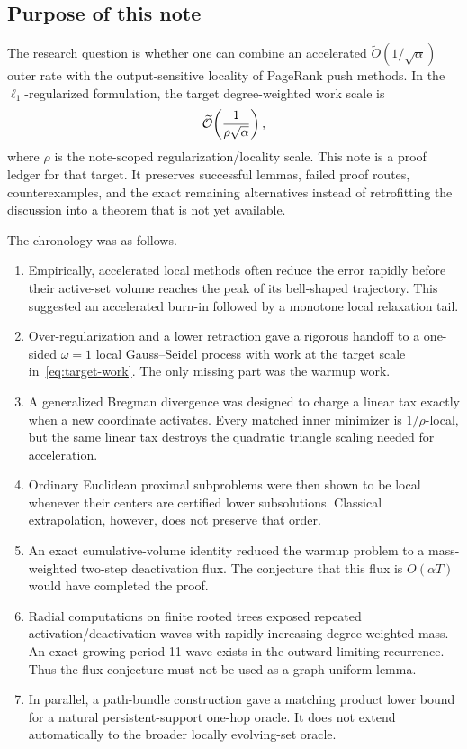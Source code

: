 \subsection{Purpose of this note}

The research question is whether one can combine an accelerated
$\widetilde O(1/\sqrt{\alpha})$ outer rate with the output-sensitive locality
of PageRank push methods.  In the $\ell_1$-regularized formulation, the target
degree-weighted work scale is
\begin{equation}
  \widetilde{\mathcal{O}}\!\left(\frac{1}{\rho\sqrt{\alpha}}\right),
  \label{eq:target-work}
\end{equation}
where $\rho$ is the note-scoped regularization/locality scale.  This note is a
proof ledger for that target.  It preserves successful lemmas, failed proof
routes, counterexamples, and the exact remaining alternatives instead of
retrofitting the discussion into a theorem that is not yet available.

The chronology was as follows.
\begin{enumerate}[label=\arabic*.,leftmargin=*]
  \item Empirically, accelerated local methods often reduce the error rapidly
  before their active-set volume reaches the peak of its bell-shaped
  trajectory.  This suggested an accelerated burn-in followed by a monotone
  local relaxation tail.
  \item Over-regularization and a lower retraction gave a rigorous handoff to
  a one-sided $\omega=1$ local Gauss--Seidel process with work at the target
  scale in~\eqref{eq:target-work}.  The only missing part was the warmup work.
  \item A generalized Bregman divergence was designed to charge a linear tax
  exactly when a new coordinate activates.  Every matched inner minimizer is
  $1/\rho$-local, but the same linear tax destroys the quadratic triangle
  scaling needed for acceleration.
  \item Ordinary Euclidean proximal subproblems were then shown to be local
  whenever their centers are certified lower subsolutions.  Classical
  extrapolation, however, does not preserve that order.
  \item An exact cumulative-volume identity reduced the warmup problem to a
  mass-weighted two-step deactivation flux.  The conjecture that this flux is
  $O(\alpha T)$ would have completed the proof.
  \item Radial computations on finite rooted trees exposed repeated
  activation/deactivation waves with rapidly increasing degree-weighted mass.
  An exact growing period-11 wave exists in the outward limiting recurrence.
  Thus the flux conjecture must not be used as a graph-uniform lemma.
  \item In parallel, a path-bundle construction gave a matching product lower
  bound for a natural persistent-support one-hop oracle.  It does not extend
  automatically to the broader locally evolving-set oracle.
\end{enumerate}

